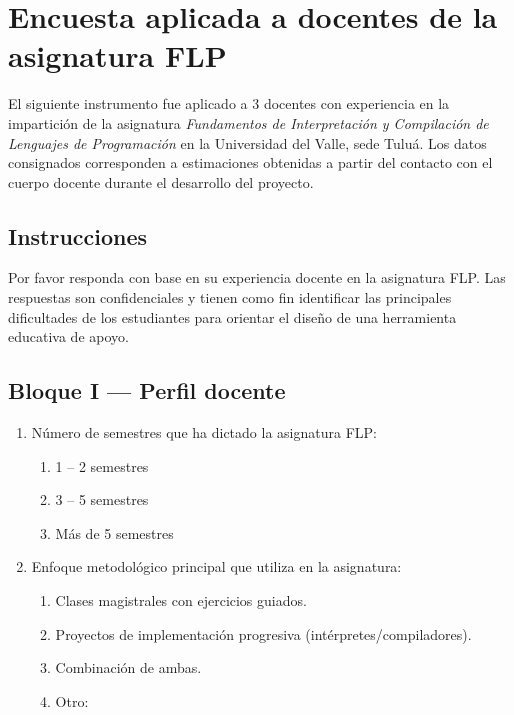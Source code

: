 \chapter{Encuesta aplicada a docentes de la asignatura FLP}
\label{annex:encuesta-docentes}

El siguiente instrumento fue aplicado a 3 docentes con experiencia en la impartición de la asignatura \textit{Fundamentos de Interpretación y Compilación de Lenguajes de Programación} en la Universidad del Valle, sede Tuluá. Los datos consignados corresponden a estimaciones obtenidas a partir del contacto con el cuerpo docente durante el desarrollo del proyecto.

\section*{Instrucciones}

Por favor responda con base en su experiencia docente en la asignatura FLP. Las respuestas son confidenciales y tienen como fin identificar las principales dificultades de los estudiantes para orientar el diseño de una herramienta educativa de apoyo.

\section*{Bloque I — Perfil docente}

\begin{enumerate}
    \item Número de semestres que ha dictado la asignatura FLP:
    \begin{enumerate}
        \item 1 – 2 semestres
        \item 3 – 5 semestres
        \item Más de 5 semestres
    \end{enumerate}

    \item Enfoque metodológico principal que utiliza en la asignatura:
    \begin{enumerate}
        \item Clases magistrales con ejercicios guiados.
        \item Proyectos de implementación progresiva (intérpretes/compiladores).
        \item Combinación de ambas.
        \item Otro: \underline{\hspace{6cm}}
    \end{enumerate}
\end{enumerate}

